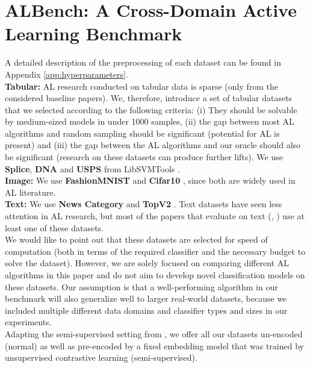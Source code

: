 \documentclass[]{article}
\begin{document}
\section{ALBench: A Cross-Domain Active Learning Benchmark}\label{sec:datasets}
A detailed description of the preprocessing of each dataset can be found in Appendix \ref{app:hyperparameters}. \\ [1mm]
\textbf{Tabular:}
AL research conducted on tabular data is sparse (only \cite{ashdeep} from the considered baseline papers). 
We, therefore, introduce a set of tabular datasets that we selected according to the following criteria:
(i) They should be solvable by medium-sized models in under 1000 samples, (ii) the gap between most AL algorithms and random sampling should be significant (potential for AL is present) and (iii) the gap between the AL algorithms and our oracle should also be significant (research on these datasets can produce further lifts).
We use \textbf{Splice}, \textbf{DNA} and \textbf{USPS} from LibSVMTools \cite{libsvmtools}.\\
\textbf{Image:}
We use \textbf{FashionMNIST} \cite{xiao2017fashion} and \textbf{Cifar10} \cite{krizhevsky2009learning}, since both are widely used in AL literature.\\
\textbf{Text:}
We use \textbf{News Category} \cite{misra2022news} and \textbf{TopV2} \cite{chen-etal-2020-low-resource}.
Text datasets have seen less attention in AL research, but most of the papers that evaluate on text (\cite{hu2021towards}, \cite{zhou2021towards}) use at least one of these datasets.\\ [1mm]
%
We would like to point out that these datasets are selected for speed of computation (both in terms of the required classifier and the necessary budget to solve the dataset). 
However, we are solely focused on comparing different AL algorithms in this paper and do not aim to develop novel classification models on these datasets.
Our assumption is that a well-performing algorithm in our benchmark will also generalize well to larger real-world datasets, because we included multiple different data domains and classifier types and sizes in our experiments. \\ [1mm]
Adapting the semi-supervised setting from \cite{hacohen2022active}, we offer all our datasets un-encoded (normal) as well as pre-encoded by a fixed embedding model that was trained by unsupervised contrastive learning (semi-supervised).
\end{document}
